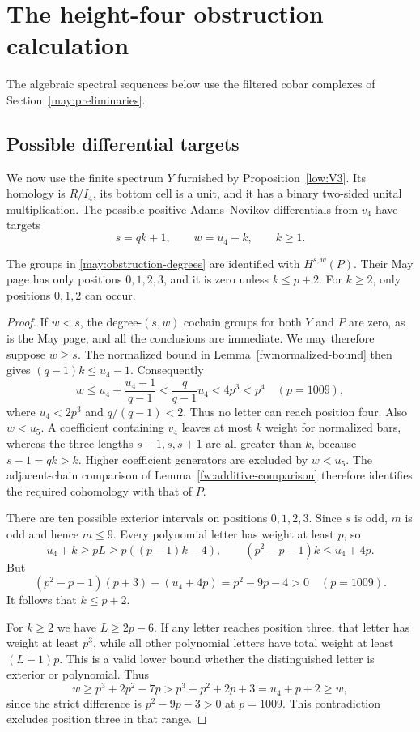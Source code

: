 \section{The height-four obstruction calculation}
\label{may:section}

The algebraic spectral sequences below use the filtered cobar complexes
of Section~\ref{may:preliminaries}.

\subsection{Possible differential targets}

We now use the finite spectrum $Y$ furnished by
Proposition~\ref{low:V3}.  Its homology is $R/I_4$, its bottom cell is a
unit, and it has a binary two-sided unital multiplication.  The possible
positive Adams--Novikov differentials from $v_4$ have targets
\begin{equation}
 s=qk+1,\qquad w=u_4+k,\qquad k\geq1.
 \label{may:obstruction-degrees}
\end{equation}

\begin{lemma}
\label{may:target-bound}
The groups in \eqref{may:obstruction-degrees} are identified with
$H^{s,w}(P)$.  Their May page has only positions $0,1,2,3$, and it is zero
unless $k\leq p+2$.  For $k\geq2$, only positions $0,1,2$ can occur.
\end{lemma}

\begin{proof}
If $w<s$, the degree-$(s,w)$ cochain groups for both $Y$ and $P$
are zero, as is the May page, and all the conclusions are immediate.
We may therefore suppose $w\geq s$.  The normalized bound in
Lemma~\ref{fw:normalized-bound} then gives
$(q-1)k\leq u_4-1$.  Consequently
\[
 w\leq u_4+\frac{u_4-1}{q-1}
 <\frac q{q-1}u_4<4p^3<p^4
 \quad (p=1009),
\]
where $u_4<2p^3$ and $q/(q-1)<2$.  Thus no letter can reach position
four.  Also $w<u_5$.  A coefficient containing $v_4$ leaves at most $k$
weight for normalized bars, whereas the three lengths $s-1,s,s+1$ are
all greater than $k$, because $s-1=qk>k$.  Higher coefficient generators
are excluded by $w<u_5$.  The adjacent-chain comparison of
Lemma~\ref{fw:additive-comparison} therefore identifies the required
cohomology with that of $P$.

There are ten possible exterior intervals on positions $0,1,2,3$.
Since $s$ is odd, $m$ is odd and hence $m\leq9$.  Every polynomial letter
has weight at least $p$, so
\[
 u_4+k\geq pL\geq p((p-1)k-4),
 \qquad
 (p^2-p-1)k\leq u_4+4p.
\]
But
\[
 (p^2-p-1)(p+3)-(u_4+4p)=p^2-9p-4>0
 \quad (p=1009).
\]
It follows that $k\leq p+2$.

For $k\geq2$ we have $L\geq2p-6$.  If any letter reaches position
three, that letter has weight at least $p^3$, while all other polynomial
letters have total weight at least $(L-1)p$.  This is a valid lower bound
whether the distinguished letter is exterior or polynomial.  Thus
\[
 w\geq p^3+2p^2-7p
 >p^3+p^2+2p+3=u_4+p+2\geq w,
\]
since the strict difference is $p^2-9p-3>0$ at $p=1009$.  This
contradiction excludes position three in that range.
\end{proof}

